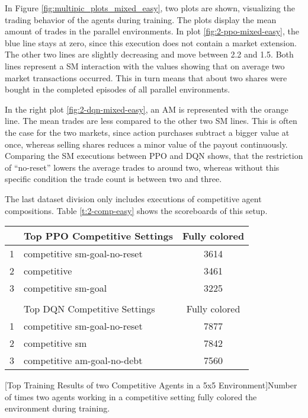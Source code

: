 In Figure \ref{fig:multipic_plots_mixed_easy}, two plots are shown, visualizing the trading behavior of the agents during training. The plots display the mean amount of trades in the parallel environments. In plot \ref{fig:2-ppo-mixed-easy}, the blue line stays at zero, since this execution does not contain a market extension. The other two lines are slightly decreasing and move between 2.2 and 1.5. Both lines represent a SM interaction with the values showing that on average two market transactions occurred. This in turn means that about two shares were bought in the completed episodes of all parallel environments.

In the right plot \ref{fig:2-dqn-mixed-easy}, an AM is represented with the orange line. The mean trades are less compared to the other two SM lines. This is often the case for the two markets, since action purchases subtract a bigger value at once, whereas selling shares reduces a minor value of the payout continuously. Comparing the SM executions between PPO and DQN shows, that the restriction of ``no-reset'' lowers the average trades to around two, whereas without this specific condition the trade count is between two and three.

The last dataset division only includes executions of competitive agent compositions. Table \ref{t:2-comp-easy} shows the scoreboards of this setup.

\begin{center}
    \begin{tabular}{clc}\hline
         & Top PPO Competitive Settings & Fully colored \\ \hline
        {\small 1} & competitive sm-goal-no-reset & 3614 \\
        {\small 2} & competitive & 3461 \\
        {\small 3} & competitive sm-goal & 3225 \\ \hline
         &   \\ \hline
         & Top DQN Competitive Settings & Fully colored \\ \hline
        {\small 1} & competitive sm-goal-no-reset & 7877 \\
        {\small 2} & competitive sm & 7842 \\
        {\small 3} & competitive am-goal-no-debt & 7560 \\ \hline
        \end{tabular}
        [Top Training Results of two Competitive Agents in a 5x5 Environment]{Number of times two agents working in a competitive setting fully colored the environment during training.}\label{t:2-comp-easy}
    \end{center}

